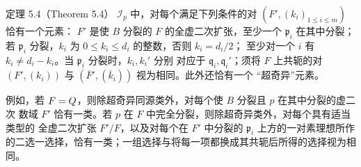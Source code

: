 \begin{originaltheorem}{定理 5.4（Theorem 5.4）}
$\mathcal I_p$ 中，对每个满足下列条件的对 $(F',(k_i)_{1\le i\le m})$ 恰有一个元素：
$F'$ 是使 $B$ 分裂的 $F$ 的全虚二次扩张，至少一个 $\mathfrak p_i$ 在其中分裂；
若 $\mathfrak p_i$ 分裂，$k_i$ 为 $0\le k_i\le d_i$ 的整数，否则 $k_i=d_i/2$；
至少对一个 $i$ 有 $k_i\ne d_i-k_i$。当 $\mathfrak p_i$ 分裂时，$k_i,k_i'$ 分别
对应于 $\mathfrak q_i,\mathfrak q_i'$；须将 $F$ 上共轭的对
$(F',(k_i))$ 与 $(\overline F',(\overline k_i))$ 视为相同。此外还恰有一个
“超奇异”元素。
\end{originaltheorem}
例如，若 $F=Q$，则除超奇异同源类外，对每个使 $B$ 分裂且 $p$ 在其中分裂的虚二次
数域 $F'$ 恰有一类。若 $p$ 在 $F$ 中完全分裂，则除超奇异类外，对每个具有适当类型的
全虚二次扩张 $F'/F$，以及对每个在 $F'$ 中分裂的 $\mathfrak p_i$ 上方的一对素理想所作
的二选一选择，恰有一类；一组选择与将每一项都换成其共轭后所得的选择视为相同。
